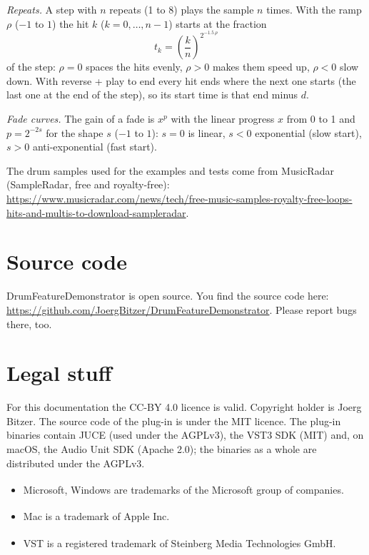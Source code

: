 \documentclass[12pt]{article}
\newcommand{\pluginauthor}{Joerg Bitzer}
\newcommand{\sourceurl}{https://github.com/JoergBitzer/DrumFeatureDemonstrator}
\begin{document}
\emph{Repeats.} A step with $n$ repeats (1 to 8) plays the sample $n$ times. With the ramp $\rho$ ($-1$ to $1$) the hit $k$ ($k = 0, \dots, n-1$) starts at the fraction
\[
  t_k = \left(\frac{k}{n}\right)^{2^{-1.5\,\rho}}
\]
of the step: $\rho = 0$ spaces the hits evenly, $\rho > 0$ makes them speed up, $\rho < 0$ slow down. With reverse + play to end every hit ends where the next one starts
(the last one at the end of the step), so its start time is that end minus $d$.

\emph{Fade curves.} The gain of a fade is $x^{p}$ with the linear progress $x$ from 0 to 1 and $p = 2^{-2s}$ for the shape $s$ ($-1$ to $1$): $s = 0$ is linear,
$s < 0$ exponential (slow start), $s > 0$ anti-exponential (fast start).

The drum samples used for the examples and tests come from MusicRadar (SampleRadar, free and royalty-free):
\url{https://www.musicradar.com/news/tech/free-music-samples-royalty-free-loops-hits-and-multis-to-download-sampleradar}.

\section{Source code}
DrumFeatureDemonstrator is open source. You find the source code here:\newline
\url{\sourceurl}. Please report bugs there, too.

\section{Legal stuff}
For this documentation the CC-BY 4.0 licence is valid. Copyright holder is \pluginauthor.
The source code of the plug-in is under the MIT licence. The plug-in binaries contain JUCE
(used under the AGPLv3), the VST3 SDK (MIT) and, on macOS, the Audio Unit SDK (Apache 2.0);
the binaries as a whole are distributed under the AGPLv3.

\begin{itemize}
    \item Microsoft\textsuperscript{\textregistered}, Windows\textsuperscript{\textregistered}
    are trademarks of the Microsoft group of companies.
    \item Mac\textsuperscript{\textregistered} is a trademark of Apple Inc.
    \item VST\textsuperscript{\textregistered} is a registered trademark of Steinberg Media
    Technologies GmbH.
\end{itemize}
\end{document}
